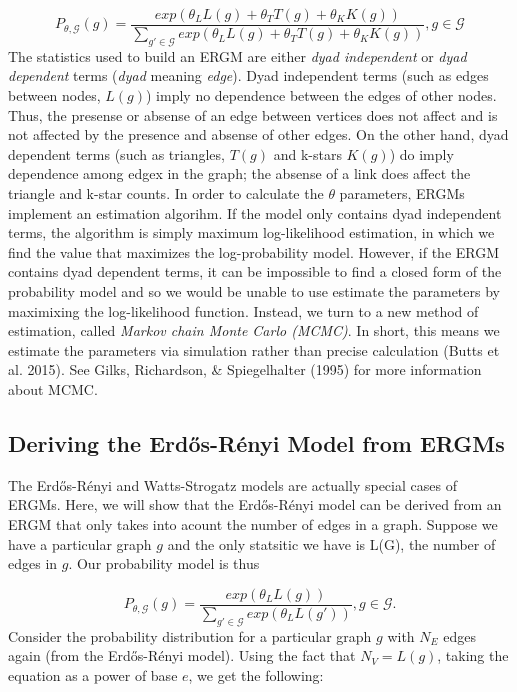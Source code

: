\documentclass[12pt,twoside]{amherstthesis}
\begin{document}
  \[P_{\theta, \mathcal{G}}(g) = \frac {exp(\theta_{L}L(g) + \theta_{T}T(g)+\theta_{K}K(g))} {\sum_{g' \in \mathcal{G}}^{} exp(\theta_{L}L(g) + \theta_{T}T(g)+\theta_{K}K(g))}, g \in \mathcal{G} \]
  The statistics used to build an ERGM are either \emph{dyad independent}
  or \emph{dyad dependent} terms (\emph{dyad} meaning \emph{edge}). Dyad
  independent terms (such as edges between nodes, \(L(g)\)) imply no
  dependence between the edges of other nodes. Thus, the presense or
  absense of an edge between vertices does not affect and is not affected
  by the presence and absense of other edges. On the other hand, dyad
  dependent terms (such as triangles, \(T(g)\) and k-stars \(K(g)\)) do
  imply dependence among edgex in the graph; the absense of a link does
  affect the triangle and k-star counts. In order to calculate the
  \(\theta\) parameters, ERGMs implement an estimation algorihm. If the
  model only contains dyad independent terms, the algorithm is simply
  maximum log-likelihood estimation, in which we find the value that
  maximizes the log-probability model. However, if the ERGM contains dyad
  dependent terms, it can be impossible to find a closed form of the
  probability model and so we would be unable to use estimate the
  parameters by maximixing the log-likelihood function. Instead, we turn
  to a new method of estimation, called \emph{Markov chain Monte Carlo
  (MCMC)}. In short, this means we estimate the parameters via simulation
  rather than precise calculation (Butts et al. 2015). See Gilks,
  Richardson, \& Spiegelhalter (1995) for more information about MCMC.
  
  \subsection{Deriving the Erdős-Rényi Model from
  ERGMs}\label{deriving-the-erdos-renyi-model-from-ergms}
  
  The Erdős-Rényi and Watts-Strogatz models are actually special cases of
  ERGMs. Here, we will show that the Erdős-Rényi model can be derived from
  an ERGM that only takes into acount the number of edges in a graph.
  Suppose we have a particular graph \(g\) and the only statsitic we have
  is L(G), the number of edges in \(g\). Our probability model is thus
  
  \[P_{\theta, \mathcal{G}}(g) = \frac {exp(\theta_{L}L(g))} {\sum_{g' \in \mathcal{G}}^{} exp(\theta_{L}L(g'))}, g \in \mathcal{G}.\]
  Consider the probability distribution for a particular graph \(g\) with
  \(N_E\) edges again (from the Erdős-Rényi model). Using the fact that
  \(N_{V} = L(g)\), taking the equation as a power of base \(e\), we get
  the following:
  
\end{document}
